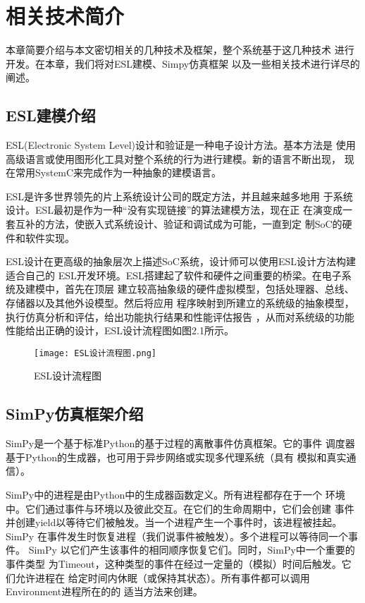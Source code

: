 
\chapter{相关技术简介}
本章简要介绍与本文密切相关的几种技术及框架，整个系统基于这几种技术
进行开发。在本章，我们将对ESL建模、Simpy仿真框架
以及一些相关技术进行详尽的阐述。

\section{ESL建模介绍}
ESL(Electronic System Level)设计和验证是一种电子设计方法。基本方法是
使用高级语言或使用图形化工具对整个系统的行为进行建模。新的语言不断出现，
现在常用SystemC来完成作为一种抽象的建模语言。

ESL是许多世界领先的片上系统设计公司的既定方法，并且越来越多地用
于系统设计。ESL最初是作为一种“没有实现链接”的算法建模方法，现在正
在演变成一套互补的方法，使嵌入式系统设计、验证和调试成为可能，一直到定
制SoC的硬件和软件实现\cite{41}。

ESL设计在更高级的抽象层次上描述SoC系统，设计师可以使用ESL设计方法构建适合自己的
ESL开发环境。ESL搭建起了软件和硬件之间重要的桥梁。在电子系统及建模中，首先在顶层
建立较高抽象级的硬件虚拟模型，包括处理器、总线、存储器以及其他外设模型。然后将应用
程序映射到所建立的系统级的抽象模型，执行仿真分析和评估，给出功能执行结果和性能评估报告
，从而对系统级的功能性能给出正确的设计，ESL设计流程图\cite{42}如图2.1所示。

\begin{figure}
  \centering
  \texttt{[image: ESL设计流程图.png]}
  \caption{ESL设计流程图}
  \label{fig:badge}
\end{figure}

\section{SimPy仿真框架介绍}
SimPy是一个基于标准Python的基于过程的离散事件仿真框架。它的事件
调度器基于Python的生成器，也可用于异步网络或实现多代理系统（具有
模拟和真实通信）。

SimPy中的进程是由Python中的生成器函数定义。所有进程都存在于一个
环境中。它们通过事件与环境以及彼此交互。在它们的生命周期中，它们会创建
事件并创建yield以等待它们被触发。当一个进程产生一个事件时，该进程被挂起。
SimPy 在事件发生时恢复进程（我们说事件被触发）。多个进程可以等待同一个事件。
SimPy 以它们产生该事件的相同顺序恢复它们。同时，SimPy中一个重要的事件类型
为Timeout，这种类型的事件在经过一定量的（模拟）时间后触发。它们允许进程在
给定时间内休眠（或保持其状态）。所有事件都可以调用Environment进程所在的的
适当方法来创建。

